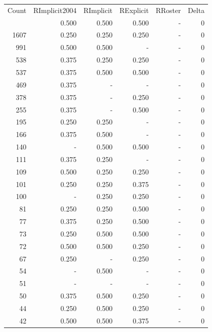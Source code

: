 \documentclass[a4paper]{article}\usepackage[]{graphicx}\usepackage[]{color}
\begin{document}
\begin{table}[ht]
\centering
\begin{tabular}{rrrrrr}
  \hline
Count & RImplicit2004 & RImplicit & RExplicit & RRoster & Delta \\ 
  \rowcolor{goodColor}  \hline
4512 & 0.500 & 0.500 & 0.500 & - & 0 \\ 
   \rowcolor{goodColor} 1607 & 0.250 & 0.250 & 0.250 & - & 0 \\ 
  991 & 0.500 & 0.500 & - & - & 0 \\ 
   \rowcolor{goodColor} 538 & 0.375 & 0.250 & 0.250 & - & 0 \\ 
   \rowcolor{goodColor} 537 & 0.375 & 0.500 & 0.500 & - & 0 \\ 
   \rowcolor{nullColor} 469 & 0.375 & - & - & - & 0 \\ 
   \rowcolor{sosoColor} 378 & 0.375 & - & 0.250 & - & 0 \\ 
   \rowcolor{sosoColor} 255 & 0.375 & - & 0.500 & - & 0 \\ 
  195 & 0.250 & 0.250 & - & - & 0 \\ 
  166 & 0.375 & 0.500 & - & - & 0 \\ 
   \rowcolor{goodColor} 140 & - & 0.500 & 0.500 & - & 0 \\ 
  111 & 0.375 & 0.250 & - & - & 0 \\ 
   \rowcolor{goodColor} 109 & 0.500 & 0.250 & 0.250 & - & 0 \\ 
  101 & 0.250 & 0.250 & 0.375 & - & 0 \\ 
   \rowcolor{goodColor} 100 & - & 0.250 & 0.250 & - & 0 \\ 
   \rowcolor{badColor} 81 & 0.250 & 0.250 & 0.500 & - & 0 \\ 
   \rowcolor{badColor} 77 & 0.375 & 0.250 & 0.500 & - & 0 \\ 
   \rowcolor{goodColor} 73 & 0.250 & 0.500 & 0.500 & - & 0 \\ 
   \rowcolor{badColor} 72 & 0.500 & 0.500 & 0.250 & - & 0 \\ 
   \rowcolor{sosoColor} 67 & 0.250 & - & 0.250 & - & 0 \\ 
  54 & - & 0.500 & - & - & 0 \\ 
   \rowcolor{nullColor} 51 & - & - & - & - & 0 \\ 
   \rowcolor{badColor} 50 & 0.375 & 0.500 & 0.250 & - & 0 \\ 
   \rowcolor{badColor} 44 & 0.250 & 0.500 & 0.250 & - & 0 \\ 
  42 & 0.500 & 0.500 & 0.375 & - & 0 \\ 

\end{tabular}
\end{table}
\end{document}

